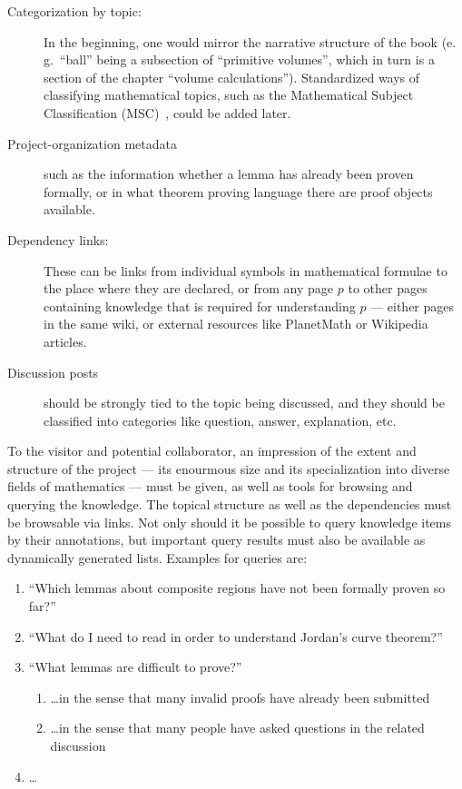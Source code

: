 \begin{description}
\item[Categorization by topic:] In the beginning, one would mirror the narrative structure
  of the book (e.\,g.\ ``ball'' being a subsection of ``primitive volumes'', which in turn
  is a section of the chapter ``volume calculations'').  Standardized ways of classifying
  mathematical topics, such as the Mathematical Subject Classification
  (MSC)~\cite{AMS:MSC2000}, could be added later.
\item[Project-organization metadata] such as the information whether a lemma has already
  been proven formally, or in what theorem proving language there are proof objects
  available.
\item[Dependency links:] These can be links from individual symbols in mathematical
  formulae to the place where they are declared, or from any page $p$ to other pages
  containing knowledge that is required for understanding $p$ --- either pages in the same
  wiki, or external resources like PlanetMath or Wikipedia articles.
\item[Discussion posts] should be strongly tied to the topic being discussed, and they
  should be classified into categories like question, answer, explanation,
  etc.
\end{description}

To the visitor and potential collaborator, an impression of the extent and structure of
the project --- its enourmous size and its specialization into diverse fields of
mathematics --- must be given, as well as tools for browsing and querying the knowledge.
The topical structure as well as the dependencies must be browsable via links.  Not only
should it be possible to query knowledge items by their annotations, but important query
results must also be available as dynamically generated lists.  Examples for queries are:

\begin{enumerate}
\item\label{item:proven-lemma} ``Which lemmas about composite regions have not been
  formally proven so far?''
\item ``What do I need to read in order to understand Jordan's curve
  theorem?''
\item ``What lemmas are difficult to prove?''
  \begin{enumerate}
  \item \ldots in the sense that many invalid proofs have already been submitted
  \item\label{item:question-count} \ldots in the sense that many people have asked
    questions in the related discussion
  \end{enumerate}
\item \ldots{}
\end{enumerate}

